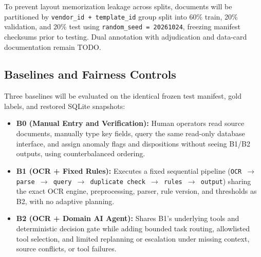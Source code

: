 \documentclass[conference]{IEEEtran}
\begin{document}
To prevent layout memorization leakage across splits, documents will be partitioned by \texttt{vendor\_\allowbreak id + template\_\allowbreak id} group split into 60\% train, 20\% validation, and 20\% test using \texttt{random\_\allowbreak seed = 20261024}, freezing manifest checksums prior to testing. Dual annotation with adjudication and data-card documentation remain TODO.

\subsection{Baselines and Fairness Controls}
Three baselines will be evaluated on the identical frozen test manifest, gold labels, and restored SQLite snapshots:
\begin{itemize}
    \item \textbf{B0 (Manual Entry and Verification):} Human operators read source documents, manually type key fields, query the same read-only database interface, and assign anomaly flags and dispositions without seeing B1/B2 outputs, using counterbalanced ordering.
    \item \textbf{B1 (OCR + Fixed Rules):} Executes a fixed sequential pipeline (\texttt{OCR $\rightarrow$ parse $\rightarrow$ query $\rightarrow$ duplicate check $\rightarrow$ rules $\rightarrow$ output}) sharing the exact OCR engine, preprocessing, parser, rule version, and thresholds as B2, with no adaptive planning.
    \item \textbf{B2 (OCR + Domain AI Agent):} Shares B1's underlying tools and deterministic decision gate while adding bounded task routing, allowlisted tool selection, and limited replanning or escalation under missing context, source conflicts, or tool failures.
\end{itemize}
\end{document}

